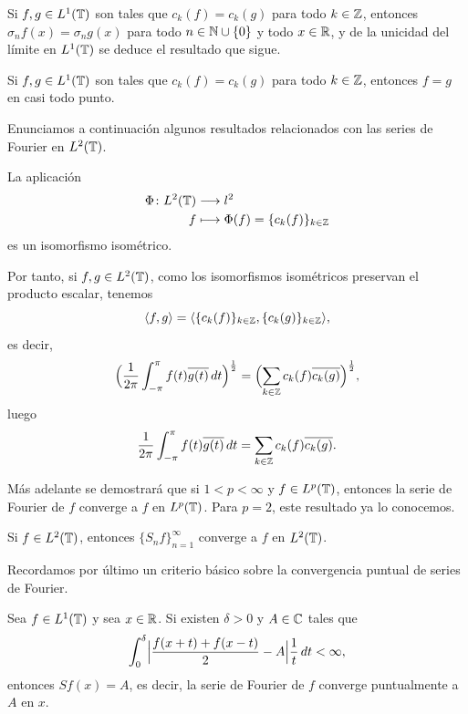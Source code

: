 \documentclass[a4paper, 12pt, oneside]{book}
\begin{document}
Si $f,g \in L^1(\mathbb T)$ son tales que $c_k(f) = c_k(g)$ para todo $k \in \mathbb Z$, entonces $\sigma_nf(x)=\sigma_ng(x)$ para todo $n \in \mathbb N \cup \{0\}$ y todo $x \in \mathbb R$, y de la unicidad del límite en $L^1(\mathbb T)$ se deduce el resultado que sigue.

\begin{corollary}\label{1.1.7}
    Si $f,g \in L^1(\mathbb T)$ son tales que $c_k(f) = c_k(g)$ para todo $k \in \mathbb Z$, entonces $f = g$ en casi todo punto.
\end{corollary}

Enunciamos a continuación algunos resultados relacionados con las series de Fourier en $L^2(\mathbb T)$.

\begin{theorem}
    La aplicación
    \begin{align*}
        \Phi \colon L^2(\mathbb T) &\longrightarrow l^2 \\
        f &\longmapsto \Phi(f) = \{c_k(f)\}_{k\in\mathbb Z}
    \end{align*}
    es un isomorfismo isométrico.
\end{theorem}

Por tanto, si $f,g \in L^2(\mathbb T)$, como los isomorfismos isométricos preservan el producto escalar, tenemos
\[\langle f,g \rangle = \langle \{c_k(f)\}_{k\in\mathbb Z}, \{c_k(g)\}_{k\in\mathbb Z} \rangle,\]
es decir,
\[\Bigl(\frac{1}{2\pi}\int_{-\pi}^{\pi} f(t)\overline{g(t)} \, dt\Bigr)^{\frac{1}{2}} = \Bigl(\sum_{k\in\mathbb Z} c_k(f)\overline{c_k(g)}\Bigr)^{\frac{1}{2}},\]
luego
\begin{equation}\label{1.2.9}
    \frac{1}{2\pi}\int_{-\pi}^{\pi} f(t)\overline{g(t)} \, dt = \sum_{k\in\mathbb Z} c_k(f)\overline{c_k(g)}.
\end{equation}

Más adelante se demostrará que si $1<p<\infty$ y $f\in L^p(\mathbb T)$, entonces la serie de Fourier de $f$ converge a $f$ en $L^p(\mathbb T)$. Para $p=2$, este resultado ya lo conocemos.
\begin{theorem}
    Si $f \in L^2(\mathbb T)$, entonces $\{S_nf\}_{n=1}^\infty$ converge a $f$ en $L^2(\mathbb T)$.
\end{theorem}

Recordamos por último un criterio básico sobre la convergencia puntual de series de Fourier.

\begin{theorem}
    Sea $f \in L^1(\mathbb T)$ y sea $x \in \mathbb R$. Si existen $\delta > 0$ y $A \in \mathbb C$ tales que
    \[\int_{0}^{\delta} \Bigl|\frac{f(x+t)+f(x-t)}{2}-A\Bigr|\frac{1}{t} \, dt < \infty,\]
    entonces $Sf(x) = A$, es decir, la serie de Fourier de $f$ converge puntualmente a $A$ en $x$.
\end{theorem}
\end{document}
